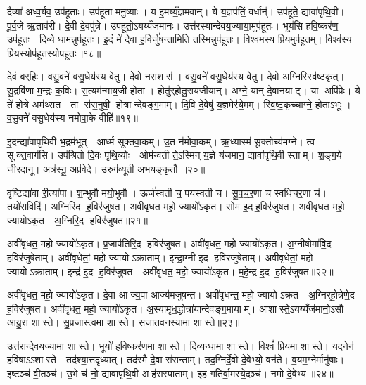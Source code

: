 दैव्या॑ अध्व॒र्यव॒ उप॑हूताः। उप॑हूता मनु॒ष्याः। य इ॒मय्यँ॒ज्ञमवान्॑। ये य॒ज्ञप॑तिं॒ वर्धान्॑। उप॑हूते॒ द्यावा॑पृथि॒वी। पू॒र्व॒जे ऋ॒ताव॑री। दे॒वी दे॒वपु॑त्रे। उप॑हूतो॒ऽयय्यँज॑मानः। उत्त॑रस्यान्देवय॒ज्याया॒मुप॑हूतः। भूय॑सि हवि॒ष्कर॑ण॒ उप॑हूतः। दि॒व्ये धाम॒न्नुप॑हूतः। इ॒दं मे॑ दे॒वा ह॒विर्जु॑षन्ता॒मिति॒ तस्मि॒न्नुप॑हूतः। विश्व॑मस्य प्रि॒यमुप॑हूतम्। विश्व॑स्य प्रि॒यस्योप॑हूत॒स्योप॑हूतः॥१८॥\anuvakamend[स॒हर्‌ष॑भा ह्वयता॒मुप॑हूत हवि॒ष्कर॑ण॒ उप॑हूतश्च॒त्वारि॑ च]

दे॒वं ब॒र्‌हिः। व॒सु॒वने॑ वसु॒धेय॑स्य वेतु। दे॒वो नरा॒शस॑। व॒सु॒वने॑ वसु॒धेय॑स्य वेतु। दे॒वो अ॒ग्निस्स्वि॑ष्ट॒कृत्। सु॒द्रवि॑णा म॒न्द्रः क॒विः। स॒त्यम॑न्माय॒जी होता। होतु॑र्‌होतु॒राय॑जीयान्। अग्ने॒ यान् दे॒वानयाट्। या अपि॑प्रेः। ये ते॑ हो॒त्रे अम॑थ्सत। ता स॑स॒नुषी॒ होत्रान्देवङ्ग॒माम्। दि॒वि दे॒वेषु॑ य॒ज्ञमेर॑ये॒मम्। स्वि॒ष्ट॒कृच्चाग्ने॒ होताऽभूः। व॒सु॒वने॑ वसु॒धेय॑स्य नमोवा॒के वीहि॑॥१९॥\anuvakamend[अपि॑प्रे॒ पञ्च॑ च]

इ॒दन्द्या॑वापृथिवी भ॒द्रम॑भूत्। आर्ध्म॑ सूक्तवा॒कम्। उ॒त न॑मोवा॒कम्। ऋ॒ध्यास्म॑ सू॒क्तोच्य॑मग्ने। त्व सूक्त॒वाग॑सि। उप॑श्रितो दि॒वः पृ॑थि॒व्योः। ओम॑न्वती ते॒ऽस्मिन् य॒ज्ञे य॑जमान॒ द्यावा॑पृथि॒वी स्ताम्। श॒ङ्ग॒ये जी॒रदा॑नू। अत्र॑स्नू॒ अप्र॑वेदे। उ॒रुग॑व्यूती अभय॒ङ्कृतौ॥२०॥

वृ॒ष्टिद्या॑वा री॒त्या॑पा। श॒म्भुवौ॑ मयो॒भुवौ। ऊर्ज॑स्वती च॒ पय॑स्वती च। सू॒प॒च॒र॒णा च॑ स्वधिचर॒णा च॑। तयो॑रा॒विदि॑। अ॒ग्निरि॒द ह॒विर॑जुषत। अवी॑वृधत॒ महो॒ ज्यायो॑ऽकृत। सोम॑ इ॒दह॒विर॑जुषत। अवी॑वृधत॒ महो॒ ज्यायो॑ऽकृत। अ॒ग्निरि॒द ह॒विर॑जुषत॥२१॥

अवी॑वृधत॒ महो॒ ज्यायो॑ऽकृत। प्र॒जाप॑तिरि॒द ह॒विर॑जुषत। अवी॑वृधत॒ महो॒ ज्यायो॑ऽकृत। अ॒ग्नीषोमा॑वि॒द ह॒विर॑जुषेताम्। अवी॑वृधेतां॒ महो॒ ज्यायोऽक्राताम्। इ॒न्द्रा॒ग्नी इ॒द ह॒विर॑जुषेताम्। अवी॑वृधेतां॒ महो॒ ज्यायोऽक्राताम्। इन्द्र॑ इ॒द ह॒विर॑जुषत। अवी॑वृधत॒ महो॒ ज्यायो॑ऽकृत। म॒हे॒न्द्र इ॒द ह॒विर॑जुषत॥२२॥

अवी॑वृधत॒ महो॒ ज्यायो॑ऽकृत। दे॒वा आज्य॒पा आज्य॑मजुषन्त। अवी॑वृधन्त॒ महो॒ ज्यायोऽक्रत। अ॒ग्निर्‌हो॒त्रेणे॒द ह॒विर॑जुषत। अवी॑वृधत॒ महो॒ ज्यायो॑ऽकृत। अ॒स्यामृध॒द्धोत्रा॑यान्देवङ्ग॒मायाम्। आशास्ते॒ऽयय्यँज॑मानो॒ऽसौ। आयु॒रा शास्ते। सु॒प्र॒जा॒स्त्वमा शास्ते। स॒जा॒त॒व॒न॒स्यामा शास्ते॥२३॥

उत्त॑रान्देवय॒ज्यामा शास्ते। भूयो॑ हवि॒ष्कर॑ण॒मा शास्ते। दि॒व्यन्धामा शास्ते। विश्वं॑ प्रि॒यमा शास्ते। यद॒नेन॑ ह॒विषाऽऽशास्ते। तद॑श्या॒त्तदृ॑ध्यात्। तद॑स्मै दे॒वा रा॑सन्ताम्। तद॒ग्निर्दे॒वो दे॒वेभ्यो॒ वन॑ते। व॒यम॒ग्नेर्मानु॑षाः। इ॒ष्टञ्च॑ वी॒तञ्च॑। उ॒भे च॑ नो॒ द्यावा॑पृथि॒वी अह॑सस्पाताम्। इ॒ह गति॑र्वा॒मस्ये॒दञ्च॑। नमो॑ दे॒वेभ्य॑॥२४॥\anuvakamend[अ॒भ॒य॒ङ्कृता॑वकृता॒ग्निरि॒द ह॒विर॑जुषत महे॒न्द्र इ॒द ह॒विर॑जुषत सजातवन॒स्यामा शास्ते वी॒तञ्च॒ त्रीणि॑ च]

